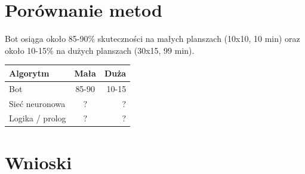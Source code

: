 \documentclass[letterpaper,12pt]{article} %
\begin{document}
\section{Porównanie metod}
Bot osiąga około 85-90\% skuteczności na małych planszach (10x10, 10 min) 
oraz około 10-15\% na dużych planszach (30x15, 99 min).
\begin{center} 
    \begin{tabular}  { | l | c | r |   }
        \hline
        Algorytm & Mała & Duża  \\
        \hline
        Bot & 85-90 & 10-15 \\
        \hline
        Sieć neuronowa & ? & ? \\
        \hline
        Logika / prolog & ? & ? \\
        \hline
    \end{tabular}
\end{center}
\section{Wnioski}
\end{document}
